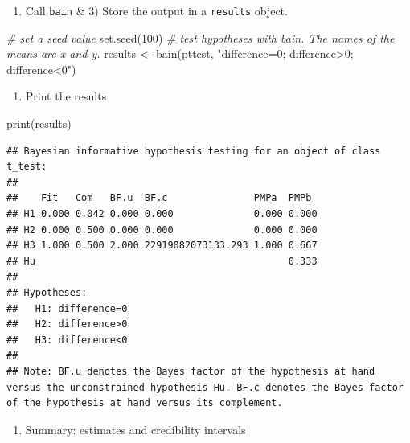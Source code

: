 \documentclass[
]{book}
\newenvironment{Shaded}{\begin{snugshade}}{\end{snugshade}}
\newcommand{\CommentTok}[1]{\textcolor[rgb]{0.56,0.35,0.01}{\textit{#1}}}
\newcommand{\DecValTok}[1]{\textcolor[rgb]{0.00,0.00,0.81}{#1}}
\newcommand{\FunctionTok}[1]{\textcolor[rgb]{0.00,0.00,0.00}{#1}}
\newcommand{\NormalTok}[1]{#1}
\newcommand{\OtherTok}[1]{\textcolor[rgb]{0.56,0.35,0.01}{#1}}
\newcommand{\StringTok}[1]{\textcolor[rgb]{0.31,0.60,0.02}{#1}}
\providecommand{\tightlist}{%
  \setlength{\itemsep}{0pt}\setlength{\parskip}{0pt}}
\begin{document}
\begin{enumerate}
\def\labelenumi{\arabic{enumi})}
\setcounter{enumi}{1}
\tightlist
\item
  Call \texttt{bain} \& 3) Store the output in a \texttt{results} object.
\end{enumerate}

\begin{Shaded}
\begin{Highlighting}[]
\CommentTok{\# set a seed value}
\FunctionTok{set.seed}\NormalTok{(}\DecValTok{100}\NormalTok{)}
\CommentTok{\# test hypotheses with bain. The names of the means are x and y.}
\NormalTok{results }\OtherTok{\textless{}{-}} \FunctionTok{bain}\NormalTok{(pttest, }\StringTok{"difference=0; difference\textgreater{}0; difference\textless{}0"}\NormalTok{)}
\end{Highlighting}
\end{Shaded}

\begin{enumerate}
\def\labelenumi{\arabic{enumi})}
\setcounter{enumi}{2}
\tightlist
\item
  Print the results
\end{enumerate}

\begin{Shaded}
\begin{Highlighting}[]
\FunctionTok{print}\NormalTok{(results)}
\end{Highlighting}
\end{Shaded}

\begin{verbatim}
## Bayesian informative hypothesis testing for an object of class t_test:
## 
##    Fit   Com   BF.u  BF.c               PMPa  PMPb 
## H1 0.000 0.042 0.000 0.000              0.000 0.000
## H2 0.000 0.500 0.000 0.000              0.000 0.000
## H3 1.000 0.500 2.000 22919082073133.293 1.000 0.667
## Hu                                            0.333
## 
## Hypotheses:
##   H1: difference=0
##   H2: difference>0
##   H3: difference<0
## 
## Note: BF.u denotes the Bayes factor of the hypothesis at hand versus the unconstrained hypothesis Hu. BF.c denotes the Bayes factor of the hypothesis at hand versus its complement.
\end{verbatim}

\begin{enumerate}
\def\labelenumi{\arabic{enumi})}
\setcounter{enumi}{3}
\tightlist
\item
  Summary: estimates and credibility intervals
\end{enumerate}
\end{document}
